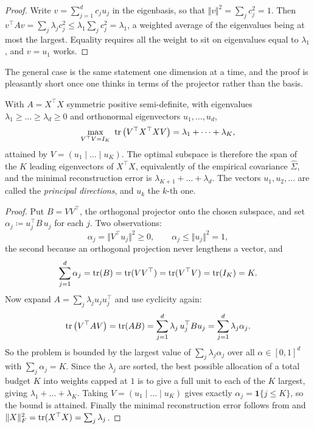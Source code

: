 \begin{proof}
Write $v = \sum_{j=1}^d c_j u_j$ in the eigenbasis, so that $\Vert v \Vert^2 = \sum_j
c_j^2 = 1$. Then $v^\top A v = \sum_j \lambda_j c_j^2 \leq \lambda_1 \sum_j c_j^2 =
\lambda_1$, a weighted average of the eigenvalues being at most the largest. Equality
requires all the weight to sit on eigenvalues equal to $\lambda_1$, and $v = u_1$ works.
\end{proof}

The general case is the same statement one dimension at a time, and the proof is
pleasantly short once one thinks in terms of the projector rather than the basis.

\begin{thm}[PCA]
\label{thm:pca}
With $A = X^\top X$ symmetric positive semi-definite, with eigenvalues $\lambda_1 \geq
\dots \geq \lambda_d \geq 0$ and orthonormal eigenvectors $u_1, \dots, u_d$,
\[
\max_{V^\top V = I_K} \ \operatorname{tr}\big( V^\top X^\top X V \big) = \lambda_1 + \dots + \lambda_K ,
\]
attained by $V = (u_1 \mid \dots \mid u_K)$. The optimal subspace is therefore the span
of the $K$ leading eigenvectors of $X^\top X$, equivalently of the empirical covariance
$\hat\Sigma$, and the minimal reconstruction error is $\lambda_{K+1} + \dots +
\lambda_d$. The vectors $u_1, u_2, \dots$ are called the \emph{principal directions},
and $u_k$ the $k$-th one.
\end{thm}

\begin{proof}
Put $B = V V^\top$, the orthogonal projector onto the chosen subspace, and set
$\alpha_j \coloneqq u_j^\top B\, u_j$ for each $j$. Two observations:
\[
\alpha_j = \Vert V^\top u_j \Vert^2 \geq 0 ,
\qquad
\alpha_j \leq \Vert u_j \Vert^2 = 1 ,
\]
the second because an orthogonal projection never lengthens a vector, and
\[
\sum_{j=1}^d \alpha_j = \operatorname{tr}(B) = \operatorname{tr}(V V^\top) = \operatorname{tr}(V^\top V) = \operatorname{tr}(I_K) = K .
\]
Now expand $A = \sum_j \lambda_j u_j u_j^\top$ and use cyclicity again:
\[
\operatorname{tr}\big( V^\top A V \big) = \operatorname{tr}(A B) = \sum_{j=1}^d \lambda_j\, u_j^\top B u_j
= \sum_{j=1}^d \lambda_j \alpha_j .
\]
So the problem is bounded by the largest value of $\sum_j \lambda_j \alpha_j$ over all
$\alpha \in [0,1]^d$ with $\sum_j \alpha_j = K$. Since the $\lambda_j$ are sorted, the
best possible allocation of a total budget $K$ into weights capped at $1$ is to give a
full unit to each of the $K$ largest, giving $\lambda_1 + \dots + \lambda_K$. Taking
$V = (u_1 \mid \dots \mid u_K)$ gives exactly $\alpha_j = \mathbf{1}\{ j \leq K\}$, so
the bound is attained. Finally the minimal reconstruction error follows from
 and $\Vert X \Vert_F^2 = \operatorname{tr}(X^\top X) = \sum_j \lambda_j$.
\end{proof}

